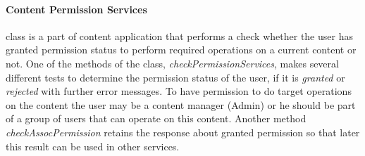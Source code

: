 \paragraph{Content Permission Services} class is a part of content application that performs a check whether the user has granted permission status to perform required operations on a current content or not. One of the methods of the class, \textit{checkPermissionServices}, makes several different tests to determine the permission status of the user, if it is \textit{granted} or \textit{rejected} with further error messages. To have permission to do target operations on the content the user may be a content manager (Admin) or he should be part of a group of users that can operate on this content. Another method \textit{checkAssocPermission} retains the response about granted permission so that later this result can be used in other services.  
